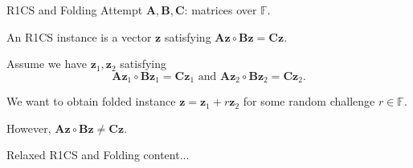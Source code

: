 \begin{frame}{R1CS and Folding Attempt}
	$\mathbf{A}, \mathbf{B}, \mathbf{C}$: matrices over $\mathbb{F}$.
	
	An R1CS instance is a vector $\mathbf{z}$ satisfying $\mathbf{A}\mathbf{z}\circ\mathbf{B}\mathbf{z} = \mathbf{C}\mathbf{z}$.
	
	Assume we have $\mathbf{z}_1, \mathbf{z}_2$ satisfying $$\mathbf{A}\mathbf{z}_1\circ\mathbf{B}\mathbf{z}_1 = \mathbf{C}\mathbf{z}_1 \text{ and } \mathbf{A}\mathbf{z}_2\circ\mathbf{B}\mathbf{z}_2 = \mathbf{C}\mathbf{z}_2.$$
	
	We want to obtain folded instance $\mathbf{z} = \mathbf{z}_1 + r\mathbf{z}_2$ for some random challenge $r \in \mathbb{F}$.
	
	However, $\mathbf{A}\mathbf{z}\circ \mathbf{B}\mathbf{z} \not= \mathbf{C}\mathbf{z}$.
\end{frame}

\begin{frame}{Relaxed R1CS and Folding}
	content...
\end{frame}